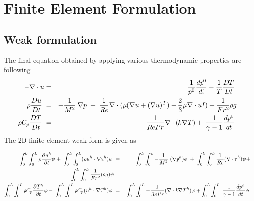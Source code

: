 \chapter{Finite Element Formulation}\label{chap:fem}
\section{Weak formulation}
The final equation obtained by applying various thermodynamic properties are following
\begin{eqnarray}
-\nabla \cdot u &=& \frac{1}{p^0} \frac{d p^0}{d t} - \frac{1}{T}\frac{D T}{D t} \hspace{1mm}\\
\rho \frac{D u}{D t} \hspace{1mm} &=& -\frac{1}{M^2}\hspace{1mm}\nabla p\hspace{1mm}+\hspace{1mm}\frac{1}{Re}\nabla \cdot (\mu (\nabla u +(\nabla u)^T) - \frac{2}{3}\mu \nabla \cdot u I) + \frac{1}{Fr^2}\rho g \\
\rho C_p \frac{D T}{D t} \hspace{1mm}&=&\hspace{1mm} -  \frac{1}{Re Pr}\nabla\cdot (k \nabla T) + \hspace{1mm} \frac{1}{\gamma -1} \frac{d p^0}{d t}\hspace{1mm}\\
\end{eqnarray}
The 2D finite element weak form  is given as

\begin{eqnarray*}
\int_{0}^{L} \int_{0}^{L}\rho \frac{\partial u^h}{\partial t} \psi + \hspace{1mm}\int_{0}^{L} \int_{0}^{L} (\rho u^h \cdot \nabla u^h ) \psi \hspace{1mm} &=& \int_{0}^{L} \int_{0}^{L}  -\frac{1}{M^2}\hspace{1mm}(\nabla p^h) \phi \hspace{1mm}+\hspace{1mm}\int_{0}^{L} \int_{0}^{L}\frac{1}{Re}(\nabla \cdot \tau^h) \psi+ \\ \int_{0}^{L} \int_{0}^{L}\frac{1}{Fr^2}(\rho g )\psi \\
\int_{0}^{L} \int_{0}^{L} \rho C_p \frac{\partial T^h}{\partial t} \varphi + \hspace{1mm}\int_{0}^{L} \int_{0}^{L} \rho C_p (u^h \cdot \nabla T^h ) \varphi  \hspace{1mm}&=&\hspace{1mm} \int_{0}^{L} \int_{0}^{L} -  \frac{1}{Re Pr}(\nabla\cdot k \nabla T^h) \varphi  + \int_{0}^{L} \int_{0}^{L} \hspace{1mm} \frac{1}{\gamma -1} \frac{d p^h}{d t} \phi  \hspace{1mm}\\
\end{eqnarray*}

